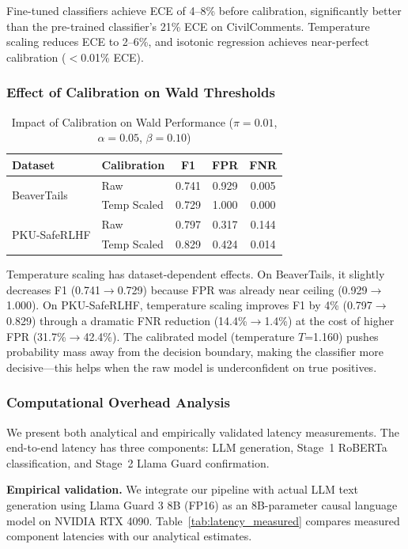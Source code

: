 \documentclass[acmtjournal, acmnowidth]{acmart}
\theoremstyle{definition}
\begin{document}
Fine-tuned classifiers achieve ECE of 4--8\% before calibration, significantly better than the pre-trained classifier's 21\% ECE on CivilComments. Temperature scaling reduces ECE to 2--6\%, and isotonic regression achieves near-perfect calibration ($<$0.01\% ECE).

\subsubsection{Effect of Calibration on Wald Thresholds}

\begin{table}[h]
\caption{Impact of Calibration on Wald Performance ($\pi=0.01$, $\alpha=0.05$, $\beta=0.10$)}
\label{tab:cal_impact}
\begin{tabular}{llccc}
\toprule
Dataset & Calibration & F1 & FPR & FNR \\
\midrule
\multirow{2}{*}{BeaverTails}
 & Raw & 0.741 & 0.929 & 0.005 \\
 & Temp Scaled & 0.729 & 1.000 & 0.000 \\
\midrule
\multirow{2}{*}{PKU-SafeRLHF}
 & Raw & 0.797 & 0.317 & 0.144 \\
 & Temp Scaled & 0.829 & 0.424 & 0.014 \\
\bottomrule
\end{tabular}
\end{table}

Temperature scaling has dataset-dependent effects. On BeaverTails, it slightly decreases F1 (0.741$\to$0.729) because FPR was already near ceiling (0.929$\to$1.000). On PKU-SafeRLHF, temperature scaling improves F1 by 4\% (0.797$\to$0.829) through a dramatic FNR reduction (14.4\%$\to$1.4\%) at the cost of higher FPR (31.7\%$\to$42.4\%). The calibrated model (temperature $T$=1.160) pushes probability mass away from the decision boundary, making the classifier more decisive---this helps when the raw model is underconfident on true positives.

\subsubsection{Computational Overhead Analysis}
\label{sec:chunking}

We present both analytical and empirically validated latency measurements. The end-to-end latency has three components: LLM generation, Stage~1 RoBERTa classification, and Stage~2 Llama Guard confirmation.

\textbf{Empirical validation.} We integrate our pipeline with actual LLM text generation using Llama Guard 3 8B (FP16) as an 8B-parameter causal language model on NVIDIA RTX 4090. Table~\ref{tab:latency_measured} compares measured component latencies with our analytical estimates.
\end{document}
